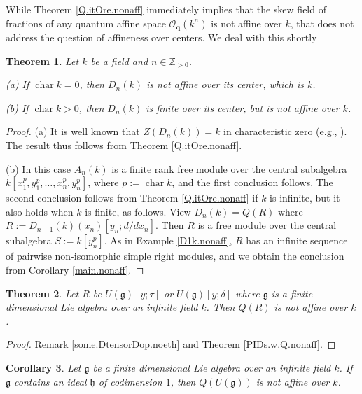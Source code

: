 \documentclass{conm-p-l}
\newtheorem{theorem}{Theorem}[section]
\newtheorem{cor}[theorem]{Corollary}
\theoremstyle{definition}
\theoremstyle{remark}
\numberwithin{equation}{section}
\newcommand{\ZZ}{\mathbb{Z}}
\newcommand \calO {{\mathcal{O}}}
\newcommand\gfrak{\mathfrak{g}}
\newcommand\hfrak{\mathfrak{h}}
\newcommand\bfq{\boldsymbol{q}}
\DeclareMathOperator{\ch}{char}
\newcommand \Zpos {\ZZ_{> 0}}
\newcommand\Obfq{\calO_{\bfq}}
\begin{document}
While Theorem \ref{Q.itOre.nonaff} immediately implies that the skew field of fractions of any quantum affine space $\Obfq(k^n)$ is not affine over $k$, that does not address the question of affineness over centers.  We deal with this shortly 

\begin{theorem}  \label{Dnk.nonaff}
Let $k$ be a field and $n \in \Zpos$.

{\rm(a)} If $\ch k = 0$, then $D_n(k)$ is not affine over its center, which is $k$.

{\rm(b)} If $\ch k > 0$, then $D_n(k)$ is finite over its center, but is not affine over $k$.
\end{theorem}

\begin{proof}
(a) It is well known that $Z(D_n(k)) = k$ in characteristic zero (e.g., \cite[Exercise 17\,O]{Goo-War}).  The result thus follows from Theorem \ref{Q.itOre.nonaff}.

(b) In this case $A_n(k)$ is a finite rank free module over the central subalgebra $k[x_1^p,y_1^p,\dots,x_n^p,y_n^p]$, where $p := \ch k$, and the first conclusion follows.  The second conclusion follows from Theorem \ref{Q.itOre.nonaff} if $k$ is infinite, but it also holds when $k$ is finite, as follows.  View $D_n(k) = Q(R)$ where $R := D_{n-1}(k)(x_n)[y_n; d/dx_n]$.  Then $R$ is a free module over the central subalgebra $S := k[y_n^p]$.  As in Example \ref{D1k.nonaff}, $R$ has an infinite sequence of pairwise non-isomorphic simple right modules, and we obtain the conclusion from Corollary \ref{main.nonaff}.
\end{proof}

\begin{theorem}  \label{Q.Ug.Ore.nonaff}
Let $R$ be $U(\gfrak)[y;\tau]$ or $U(\gfrak)[y;\delta]$ where $\gfrak$ is a finite dimensional Lie algebra over an infinite field $k$.  Then $Q(R)$ is not affine over $k$.
\end{theorem}

\begin{proof}
Remark \ref{some.DtensorDop.noeth} and Theorem \ref{PIDs.w.Q.nonaff}.
\end{proof}

\begin{cor}  \label{Q.Ug.nonaff}
Let $\gfrak$ be a finite dimensional Lie algebra over an infinite field $k$.  If $\gfrak$ contains an ideal $\hfrak$ of codimension $1$, then $Q(U(\gfrak))$ is not affine over $k$.
\end{cor}
\end{document}
